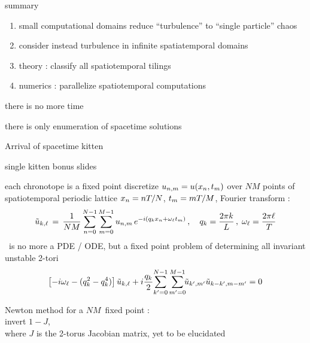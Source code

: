 \begin{frame}{summary}
\begin{enumerate}
              \item
small computational domains reduce ``turbulence'' to ``single particle'' chaos
              \item
consider instead turbulence in infinite spatiatemporal domains
              \item
theory : classify all spatiotemporal tilings
              \item
numerics : parallelize spatiotemporal computations
\end{enumerate}

\vfill

there is no more time

\medskip

there is only enumeration of spacetime solutions
\end{frame}

\begin{frame}{Arrival of spacetime kitten}
\end{frame}

\begin{frame}{single kitten bonus slides}
\end{frame}

\begin{frame}{each chronotope is a fixed point}
discretize $u_{n,m} = u(x_n,t_m)$ over
$N M$ points of spatiotemporal periodic lattice $x_n = n {T_{}}/N$,
 $t_m = m {T_{}}/M$, Fourier transform :
%
\[
\tilde{u}_{k,\ell} \,=\,
  \frac{1}{NM} \sum^{N-1}_{n=0} \sum^{M-1}_{m=0}
  u_{n,m} \, e^{-i(q_kx_n + \omega_\ell t_m)}
    \,,\quad
q_k = \frac{2 \pi k}{L}
    \,,\;
\omega_\ell = \frac{2 \pi \ell}{{T_{}}}
\]
\KS\ is no more a PDE / ODE, but a fixed point problem of
determining all invariant unstable 2-tori
\[
\left[- i \omega_\ell - ( q_k^2 - q_k^4 ) \right]\tilde{u}_{k,\ell}
+ i \frac{q_k}{2} \!\sum_{k'=0}^{N-1} \sum^{M-1}_{m'=0}\!\!
\tilde{u}_{k',m'} \tilde{u}_{k-k',m-m'}
    =
0
\]

\bigskip

Newton method for a $NM$\dmn\ fixed point :
\\ invert $1-J$,
\\ where $J$ is the
2-torus Jacobian matrix, yet to be elucidated
\end{frame}

